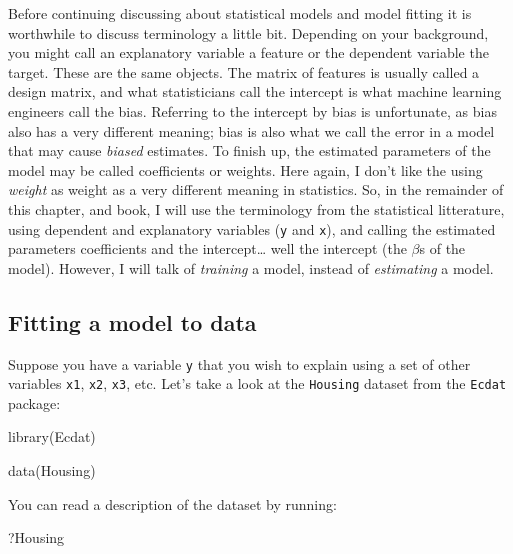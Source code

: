 \documentclass[
]{article}
\newenvironment{Shaded}{\begin{snugshade}}{\end{snugshade}}
\newcommand{\FunctionTok}[1]{\textcolor[rgb]{0.00,0.00,0.00}{#1}}
\newcommand{\NormalTok}[1]{#1}
\begin{document}
Before continuing discussing about statistical models and model fitting it is worthwhile to discuss
terminology a little bit. Depending on your background, you might call an explanatory variable a
feature or the dependent variable the target. These are the same objects. The matrix of features
is usually called a design matrix, and what statisticians call the intercept is what
machine learning engineers call the bias. Referring to the intercept by bias is unfortunate, as bias
also has a very different meaning; bias is also what we call the error in a model that may cause
\emph{biased} estimates. To finish up, the estimated parameters of the model may be called coefficients
or weights. Here again, I don't like the using \emph{weight} as weight as a very different meaning in
statistics.
So, in the remainder of this chapter, and book, I will use the terminology from the statistical
litterature, using dependent and explanatory variables (\texttt{y} and \texttt{x}), and calling the
estimated parameters coefficients and the intercept\ldots{} well the intercept (the \(\beta\)s of the model).
However, I will talk of \emph{training} a model, instead of \emph{estimating} a model.

\hypertarget{fitting-a-model-to-data}{%
\subsection{Fitting a model to data}\label{fitting-a-model-to-data}}

Suppose you have a variable \texttt{y} that you wish to explain using a set of other variables \texttt{x1}, \texttt{x2},
\texttt{x3}, etc. Let's take a look at the \texttt{Housing} dataset from the \texttt{Ecdat} package:

\begin{Shaded}
\begin{Highlighting}[]
\FunctionTok{library}\NormalTok{(Ecdat)}

\FunctionTok{data}\NormalTok{(Housing)}
\end{Highlighting}
\end{Shaded}

You can read a description of the dataset by running:

\begin{Shaded}
\begin{Highlighting}[]
\NormalTok{?Housing}
\end{Highlighting}
\end{Shaded}
\end{document}
